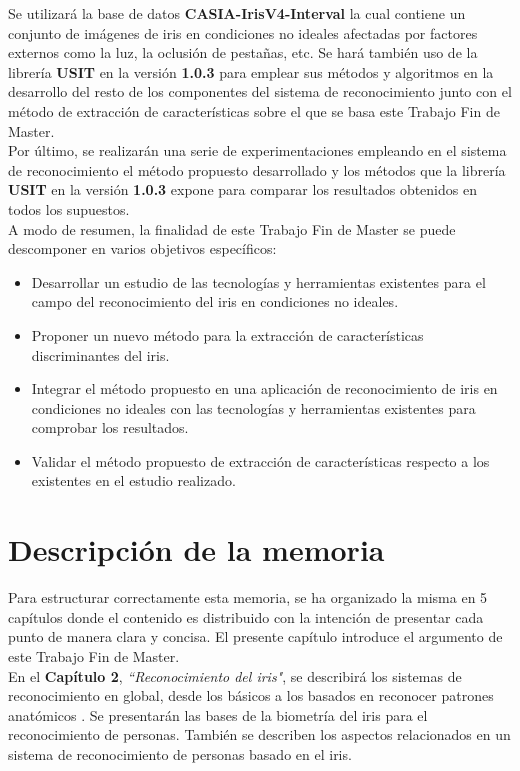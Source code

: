 Se utilizará la base de datos \textbf{CASIA-IrisV4-Interval} la cual contiene un conjunto de imágenes de iris en condiciones no ideales afectadas por factores externos como la luz, la oclusión de pestañas, etc. Se hará también uso de la librería \textbf{USIT} en la versión \textbf{1.0.3} para emplear sus métodos y algoritmos en la desarrollo del resto de los componentes del sistema de reconocimiento junto con el método de extracción de características sobre el que se basa este Trabajo Fin de Master. \\

Por último, se realizarán una serie de experimentaciones empleando en el sistema de reconocimiento el método propuesto desarrollado y los métodos que la librería \textbf{USIT} en la versión \textbf{1.0.3} expone para comparar los resultados obtenidos en todos los supuestos. \\

A modo de resumen, la finalidad de este Trabajo Fin de Master se puede descomponer en varios objetivos específicos:
\begin{itemize}
	\item Desarrollar un estudio de las tecnologías y herramientas existentes para el campo del reconocimiento del iris en condiciones no ideales.
	\item Proponer un nuevo método para la extracción de características discriminantes del iris.
	\item Integrar el método propuesto en una aplicación de reconocimiento de iris en condiciones no ideales con las tecnologías y herramientas existentes para comprobar los resultados.
	\item Validar el método propuesto de extracción de características respecto a los existentes en el estudio realizado.
\end{itemize}


\section{Descripción de la memoria}
Para estructurar correctamente esta memoria, se ha organizado la misma en 5 capítulos donde el contenido es distribuido con la intención de presentar cada punto de manera clara y concisa. El presente capítulo introduce el argumento de este Trabajo Fin de Master. \\

En el \textbf{Capítulo 2}, \emph{``Reconocimiento del iris"}, se describirá los sistemas de reconocimiento en global, desde los básicos a los basados en reconocer patrones anatómicos . Se presentarán las bases de la biometría del iris para el reconocimiento de personas. También se describen los aspectos relacionados en un sistema de reconocimiento de personas basado en el iris. \\

